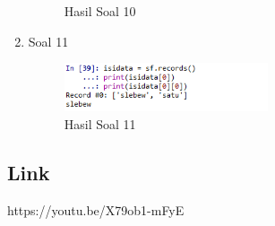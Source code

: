 \begin{enumerate}
\begin{figure}[H]
		\centering
		\caption{Hasil Soal 10 }
	\end{figure}
	\item Soal 11
	
	\begin{figure}[H]
		\includegraphics[width=6cm]{figures/Tugas3/1174071/no11.png}
		\centering
		\caption{Hasil Soal 11}
	\end{figure}
\end{enumerate}
\subsection{Link}
https://youtu.be/X79ob1-mFyE